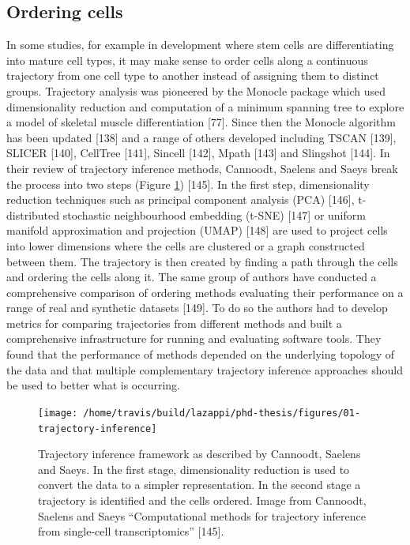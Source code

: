 \documentclass[11pt,a4paper,titlepage,twoside,openright]{style/unimelbthesis}
\theoremstyle{definition}
\theoremstyle{definition}
\theoremstyle{definition}
\theoremstyle{remark}
\begin{document}
\begin{mainmatter}
\hypertarget{ordering-cells}{%
\subsection{Ordering cells}\label{ordering-cells}}

In some studies, for example in development where stem cells are differentiating into mature cell types, it may make sense to order cells along a continuous trajectory from one cell type to another instead of assigning them to distinct groups. Trajectory analysis was pioneered by the Monocle package which used dimensionality reduction and computation of a minimum spanning tree to explore a model of skeletal muscle differentiation {[}77{]}. Since then the Monocle algorithm has been updated {[}138{]} and a range of others developed including TSCAN {[}139{]}, SLICER {[}140{]}, CellTree {[}141{]}, Sincell {[}142{]}, Mpath {[}143{]} and Slingshot {[}144{]}. In their review of trajectory inference methods, Cannoodt, Saelens and Saeys break the process into two steps (Figure \ref{fig:trajectory-inference}) {[}145{]}. In the first step, dimensionality reduction techniques such as principal component analysis (PCA) {[}146{]}, t-distributed stochastic neighbourhood embedding (t-SNE) {[}147{]} or uniform manifold approximation and projection (UMAP) {[}148{]} are used to project cells into lower dimensions where the cells are clustered or a graph constructed between them. The trajectory is then created by finding a path through the cells and ordering the cells along it. The same group of authors have conducted a comprehensive comparison of ordering methods evaluating their performance on a range of real and synthetic datasets {[}149{]}. To do so the authors had to develop metrics for comparing trajectories from different methods and built a comprehensive infrastructure for running and evaluating software tools. They found that the performance of methods depended on the underlying topology of the data and that multiple complementary trajectory inference approaches should be used to better what is occurring.

\begin{figure}

{\centering \texttt{[image: /home/travis/build/lazappi/phd-thesis/figures/01-trajectory-inference]} 

}

\caption[Trajectory inference framework as described by Cannoodt, Saelens and Saeys.]{Trajectory inference framework as described by Cannoodt, Saelens and Saeys. In the first stage, dimensionality reduction is used to convert the data to a simpler representation. In the second stage a trajectory is identified and the cells ordered. Image from Cannoodt, Saelens and Saeys \enquote{Computational methods for trajectory inference from single-cell transcriptomics} {[}145{]}.}\label{fig:trajectory-inference}
\end{figure}






\end{mainmatter}
\end{document}
